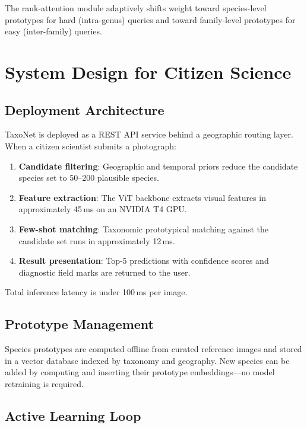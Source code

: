 \documentclass[11pt,a4paper]{article}
\begin{document}
The rank-attention module adaptively shifts weight toward species-level
prototypes for hard (intra-genus) queries and toward family-level
prototypes for easy (inter-family) queries.


\section{System Design for Citizen Science}
\label{sec:system}

\subsection{Deployment Architecture}

TaxoNet is deployed as a REST API service behind a geographic routing
layer. When a citizen scientist submits a photograph:

\begin{enumerate}
  \item \textbf{Candidate filtering}: Geographic and temporal priors
    reduce the candidate species set to 50--200 plausible species.
  \item \textbf{Feature extraction}: The ViT backbone extracts visual
    features in approximately 45\,ms on an NVIDIA T4 GPU.
  \item \textbf{Few-shot matching}: Taxonomic prototypical matching
    against the candidate set runs in approximately 12\,ms.
  \item \textbf{Result presentation}: Top-5 predictions with confidence
    scores and diagnostic field marks are returned to the user.
\end{enumerate}

Total inference latency is under 100\,ms per image.

\subsection{Prototype Management}

Species prototypes are computed offline from curated reference images and
stored in a vector database indexed by taxonomy and geography. New
species can be added by computing and inserting their prototype
embeddings---no model retraining is required.

\subsection{Active Learning Loop}
\end{document}
